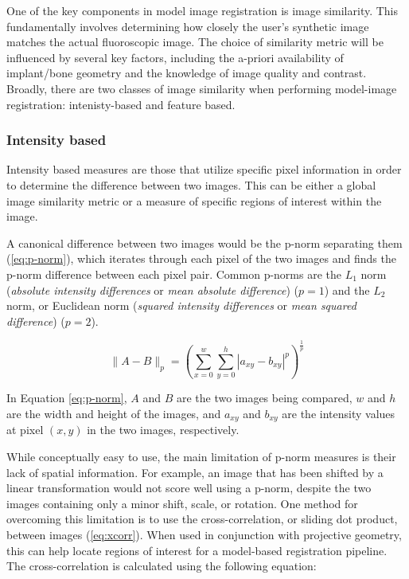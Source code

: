 One of the key components in model image registration is image similarity.
This fundamentally involves determining how closely the user's synthetic image matches the actual fluoroscopic image.
The choice of similarity metric will be influenced by several key factors, including the a-priori availability of implant/bone geometry and the knowledge of image quality and contrast.
Broadly, there are two classes of image similarity when performing model-image registration: intenisty-based and feature based.

\subsubsection{Intensity based}
\label{sec:img-sim-intensity}
Intensity based measures are those that utilize specific pixel information in order to determine the difference between two images.
This can be either a global image similarity metric or a measure of specific regions of interest within the image.

A canonical difference between two images would be the p-norm separating them (\cref{eq:p-norm}), which iterates through each pixel of the two images and finds the p-norm difference between each pixel pair.
Common p-norms are the $L_1$ norm (\emph{absolute intensity differences} or \emph{mean absolute difference}) \cite{kanadeStereoMatchingAlgorithm1994} ($p=1$) and the $L_{2}$ norm, or Euclidean norm (\emph{squared intensity differences} or \emph{mean squared difference}) \cite{hannahComputerMatchingAreas1977}($p=2$).

\begin{equation}
    \|A-B\|_{p} = (\sum_{x=0}^{w}\sum_{y=0}^{h}|a_{xy}-b_{xy}|^{p})^{\frac{1}{p}}
    \label{eq:p-norm}
\end{equation}

In Equation \cref{eq:p-norm}, $A$ and $B$ are the two images being compared, $w$ and $h$ are the width and height of the images, and $a_{xy}$ and $b_{xy}$ are the intensity values at pixel $(x,y)$ in the two images, respectively.

While conceptually easy to use, the main limitation of p-norm measures is their lack of spatial information.
For example, an image that has been shifted by a linear transformation would not score well using a p-norm, despite the two images containing only a minor shift, scale, or rotation. One method for overcoming this limitation is to use the cross-correlation, or sliding dot product, between images \cite{bendatRandomDataAnalysis2010,hannahComputerMatchingAreas1977} (\cref{eq:xcorr}).
When used in conjunction with projective geometry, this can help locate regions of interest for a model-based registration pipeline.
The cross-correlation is calculated using the following equation:

